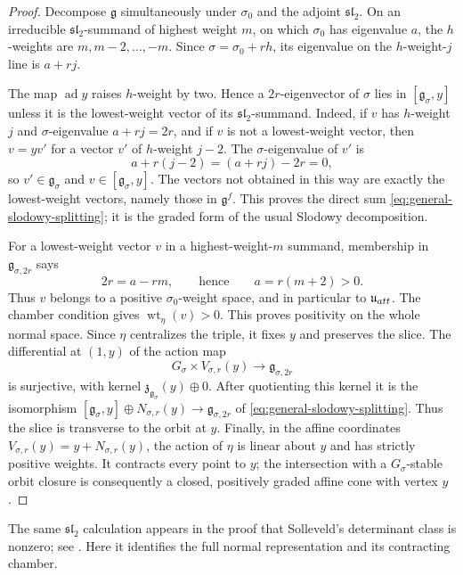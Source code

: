 \documentclass[10pt,a4paper]{amsart}
\begin{document}
\begin{proof}
Decompose $\mathfrak g$ simultaneously under $\sigma_0$ and the adjoint
$\mathfrak{sl}_2$.  On an irreducible $\mathfrak{sl}_2$-summand of highest
weight $m$, on which $\sigma_0$ has eigenvalue $a$, the $h$-weights are
$m,m-2,\ldots,-m$.  Since $\sigma=\sigma_0+rh$, its eigenvalue on the
$h$-weight-$j$ line is $a+rj$.

The map $\operatorname{ad}y$ raises $h$-weight by two.  Hence a
$2r$-eigenvector of $\sigma$ lies in
$[\mathfrak g_\sigma,y]$ unless it is the lowest-weight vector of its
$\mathfrak{sl}_2$-summand.  Indeed, if $v$ has $h$-weight $j$ and
$\sigma$-eigenvalue $a+rj=2r$, and if $v$ is not a lowest-weight vector,
then $v=yv'$ for a vector $v'$ of $h$-weight $j-2$.  The $\sigma$-eigenvalue
of $v'$ is
\[
 a+r(j-2)=(a+rj)-2r=0,
\]
so $v'\in\mathfrak g_\sigma$ and $v\in[\mathfrak g_\sigma,y]$.  The vectors
not obtained in this way are exactly the lowest-weight vectors, namely those
in $\mathfrak g^f$.  This proves the direct sum
\eqref{eq:general-slodowy-splitting}; it is the graded form of the usual
Slodowy decomposition.

For a lowest-weight vector $v$ in a highest-weight-$m$ summand, membership in
$\mathfrak g_{\sigma,2r}$ says
\[
 2r=a-rm,
 \qquad\text{hence}\qquad a=r(m+2)>0.
\]
Thus $v$ belongs to a positive $\sigma_0$-weight space, and in particular to
$\mathfrak u_{\rm att}$.  The chamber condition gives
$\operatorname{wt}_\eta(v)>0$.  This proves positivity on the whole normal
space.  Since $\eta$ centralizes the triple, it fixes $y$ and preserves the
slice.  The differential at $(1,y)$ of the action map
\[
 G_\sigma\times V_{\sigma,r}(y)\longrightarrow\mathfrak g_{\sigma,2r}
\]
is surjective, with kernel
$\mathfrak z_{\mathfrak g_\sigma}(y)\oplus0$.  After quotienting this
kernel it is the isomorphism
$[\mathfrak g_\sigma,y]\oplus N_{\sigma,r}(y)\to
\mathfrak g_{\sigma,2r}$ of \eqref{eq:general-slodowy-splitting}.  Thus the slice is transverse to the
orbit at $y$.  Finally, in the affine coordinates
$V_{\sigma,r}(y)=y+N_{\sigma,r}(y)$, the action of $\eta$ is linear about
$y$ and has strictly positive weights.  It contracts every point to $y$;
the intersection with a $G_\sigma$-stable orbit closure is consequently a
closed, positively graded affine cone with vertex $y$.
\end{proof}

The same $\mathfrak{sl}_2$ calculation appears in the proof that Solleveld's
determinant class is nonzero; see \cite[Appendix~B, Lemma~B.3]{Solleveld}.
Here it identifies the full normal representation and its contracting
chamber.
\end{document}
